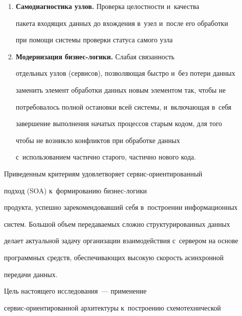 \begin{enumerate}[1.]
оптимизирующей фронт входящих сообщений по группе 


вычислительных станций и~определяющей загруженность сервисов 


путем задания последовательности действий по обеспечению 


параллельности вычислений и~хранения запросов.


\item \textbf{Самодиагностика узлов.} Проверка целостности и~качества 


пакета входящих данных до вхождения в~узел и~после его обработки 


при помощи системы проверки статуса самого узла


\item \textbf{Модернизация бизнес-логики.} Слабая связанность 


отдельных узлов (сервисов), позволяющая быстро и~без потери данных 


заменить элемент обработки данных новым элементом так, чтобы не 


потребовалось полной остановки всей системы, и~включающая в~себя 


завершение выполнения начатых процессов старым кодом, для того 


чтобы не возникло конфликтов при обработке данных 


с~использованием частично старого, частично нового кода.


     \end{enumerate}


     


     Приведенным критериям удовлетворяет сервис-ориентированный 


подход (SOA) к~формированию биз\-нес-ло\-ги\-ки 


продукта, успешно зарекомендовавший себя в~построении информационных 


систем. Большой объем передаваемых сложно структурированных данных 


делает актуальной задачу организации взаимодействия с~сервером на основе 


программных средств, обеспечивающих высокую скорость асинхронной 


передачи данных.


     


     Цель настоящего исследования~--- применение  


сервис-ориентированной архитектуры к~построению схемотехнической 


